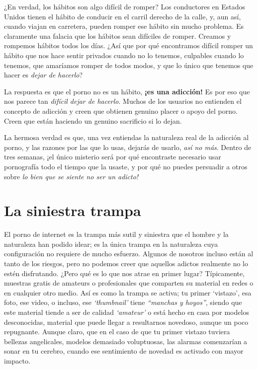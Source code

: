 \documentclass[
  spanish,
  openany]{book}
\begin{document}
¿En verdad, los hábitos son algo difícil de romper? Los conductores en Estados Unidos tienen el hábito de conducir en el carril derecho de la calle, y, aun así, cuando viajan en carretera, pueden romper ese hábito sin mucho problema. Es claramente una falacia que los hábitos sean difíciles de romper. Creamos y rompemos hábitos todos los días. ¿Así que por qué encontramos difícil romper un hábito que nos hace sentir privados cuando no lo tenemos, culpables cuando lo tenemos, que amaríamos romper de todos modos, y que lo único que tenemos que hacer es \emph{dejar de hacerlo}?

La respuesta es que el porno no es un hábito, \textbf{¡es una adicción!} Es por eso que nos parece tan \emph{difícil dejar de hacerlo}. Muchos de los usuarios no entienden el concepto de adicción y creen que obtienen genuino placer o apoyo del porno. Creen que están haciendo un genuino sacrificio si lo dejan.

La hermosa verdad es que, una vez entiendas la naturaleza real de la adicción al porno, y las razones por las que lo usas, dejarás de usarlo, \emph{así no más}. Dentro de tres semanas, ¡el único misterio será por qué encontraste necesario usar pornografía todo el tiempo que la usaste, y por qué no puedes persuadir a otros sobre \emph{lo bien que se siente no ser un adicto!}

\hypertarget{la-siniestra-trampa}{%
\section{La siniestra trampa}\label{la-siniestra-trampa}}

El porno de internet es la trampa más sutil y siniestra que el hombre y la naturaleza han podido idear; es la única trampa en la naturaleza cuya configuración no requiere de mucho esfuerzo. Algunos de nosotros incluso están al tanto de los riesgos, pero no podemos creer que aquellos adictos realmente no lo estén disfrutando. ¿Pero qué es lo que nos atrae en primer lugar? Típicamente, muestras gratis de amateurs o profesionales que comparten su material en redes o en cualquier otro medio. Así es como la trampa se activa; tu primer `vistazo', esa foto, ese video, o incluso, ese \emph{`thumbnail'} tiene \emph{``manchas y hoyos''}, siendo que este material tiende a ser de calidad \emph{`amateur'} o está hecho en casa por modelos desconocidas, material que puede llegar a resultarnos novedoso, aunque un poco repugnante. Aunque claro, que en el caso de que tu primer vistazo tuviera bellezas angelicales, modelos demasiado voluptuosas, las alarmas comenzarían a sonar en tu cerebro, cuando ese sentimiento de novedad es activado con mayor impacto.
\end{document}
